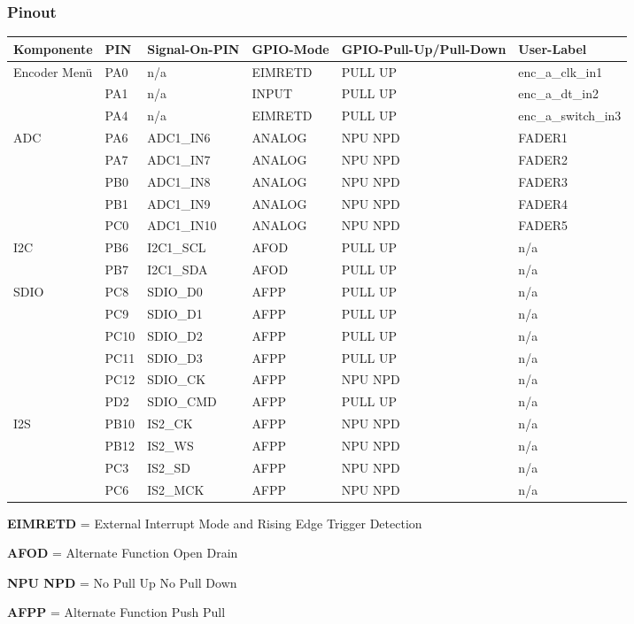 \subsubsection{Pinout}
\begin{longtable}[c]{|p{2.5cm}|p{1cm}|p{2.5cm}|p{2.5cm}|p{2.5cm}|p{3cm}|}
	\hline
	\textbf{Komponente} & \textbf{PIN} & \textbf{Signal-On-PIN} &  \textbf{GPIO-Mode} & \textbf{GPIO-Pull-Up/Pull-Down } & \textbf{User-Label}\\
	\hline
	Encoder Menü & PA0 & n/a & EIMRETD & PULL UP & enc\_a\_clk\_in1 \\
	\hline
	& PA1 & n/a &  INPUT & PULL UP & enc\_a\_dt\_in2 \\
	\hline
	& PA4 & n/a & EIMRETD & PULL UP & enc\_a\_switch\_in3 \\
	\hline
	ADC & PA6 & ADC1\_IN6 & ANALOG & NPU NPD & FADER1 \\
	\hline
	& PA7 & ADC1\_IN7 & ANALOG & NPU NPD & FADER2 \\
	\hline
	& PB0 & ADC1\_IN8 & ANALOG & NPU NPD & FADER3 \\
	\hline
	& PB1 & ADC1\_IN9 & ANALOG & NPU NPD & FADER4 \\
	\hline
	& PC0 & ADC1\_IN10 & ANALOG & NPU NPD & FADER5 \\	
	\hline
	I2C & PB6 &I2C1\_SCL & AFOD & PULL UP & n/a \\
	\hline
	& PB7 &I2C1\_SDA & AFOD & PULL UP & n/a \\
	\hline
	SDIO & PC8 & SDIO\_D0 & AFPP & PULL UP & n/a \\
	\hline
	& PC9 & SDIO\_D1 & AFPP & PULL UP & n/a \\
	\hline
	& PC10 & SDIO\_D2 & AFPP & PULL UP & n/a \\
	\hline
	& PC11 & SDIO\_D3 & AFPP & PULL UP & n/a \\
	\hline
	& PC12 & SDIO\_CK & AFPP & NPU NPD & n/a \\
	\hline
	& PD2 & SDIO\_CMD & AFPP & PULL UP & n/a \\
	\hline
	I2S & PB10 & IS2\_CK & AFPP  & NPU NPD & n/a \\
	\hline
	& PB12 & IS2\_WS & AFPP & NPU NPD & n/a \\
	\hline
	& PC3 & IS2\_SD & AFPP & NPU NPD &  n/a \\
	\hline
	& PC6 & IS2\_MCK & AFPP & NPU NPD &  n/a \\
	\hline
\end{longtable}

\textbf{EIMRETD} = External Interrupt Mode and Rising Edge Trigger Detection 		

\textbf{AFOD} = Alternate Function Open Drain

\textbf{NPU NPD} = No Pull Up No Pull Down		

\textbf{AFPP} = Alternate Function Push Pull 
